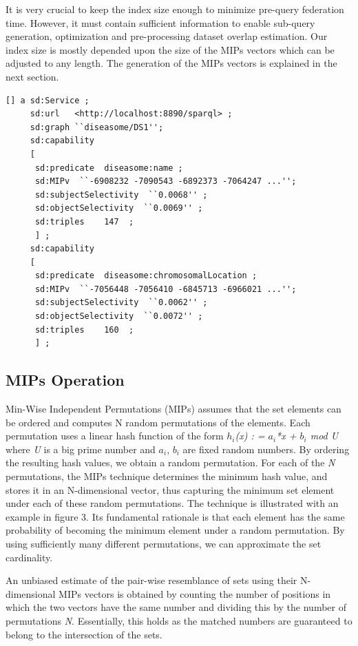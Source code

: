 \documentclass{sig-alternate}  %
\begin{document}
It is very crucial to keep the index size enough to minimize pre-query federation time. However, it must contain sufficient information to enable sub-query generation, optimization and pre-processing dataset overlap estimation. Our index size is mostly depended upon the size of the MIPs vectors which can be adjusted to any length. The generation of the MIPs vectors is explained in the next section. 
\begin{lstlisting}[caption = {A Service Description Example},basicstyle={\tiny},float,frame={single},stringstyle={\ttfamily}]
[] a sd:Service ;
     sd:url   <http://localhost:8890/sparql> ;
     sd:graph ``diseasome/DS1'';
     sd:capability
     [
      sd:predicate  diseasome:name ;
      sd:MIPv  ``-6908232 -7090543 -6892373 -7064247 ...'';           
      sd:subjectSelectivity  ``0.0068'' ;
      sd:objectSelectivity  ``0.0069'' ;
      sd:triples    147  ;
      ] ;
     sd:capability
     [
      sd:predicate  diseasome:chromosomalLocation ;
      sd:MIPv  ``-7056448 -7056410 -6845713 -6966021 ...'';
      sd:subjectSelectivity  ``0.0062'' ;
      sd:objectSelectivity  ``0.0072'' ;
      sd:triples    160  ;
      ] ;
\end{lstlisting}
\subsection{MIPs Operation}
Min-Wise Independent Permutations (MIPs) assumes that the set elements can
be ordered and computes N random
permutations of the elements. Each permutation uses a linear hash
function of the form  \emph{$h_i$(x) : = $a_i$*x + $b_i$ mod U} 
where \emph{U} is a big prime number and $a_i$,
$b_i$ are fixed random numbers. By ordering the resulting
hash values, we obtain a random permutation. For each of the \emph{N} permutations,
the MIPs technique determines the minimum hash value, and stores it
in an N-dimensional vector, thus capturing the minimum set element
under each of these random permutations. The technique is illustrated
with an example in figure 3. Its fundamental rationale
is that each element has the same probability of becoming the minimum
element under a random permutation. By using sufficiently many different
permutations, we can approximate the set cardinality.

An unbiased estimate of the pair-wise resemblance of sets using their
N-dimensional MIPs vectors is obtained by counting the number of positions
in which the two vectors have the same number and dividing this by
the number of permutations \emph{N}. Essentially, this holds as the matched
numbers are guaranteed to belong to the intersection of the sets.
\end{document}
